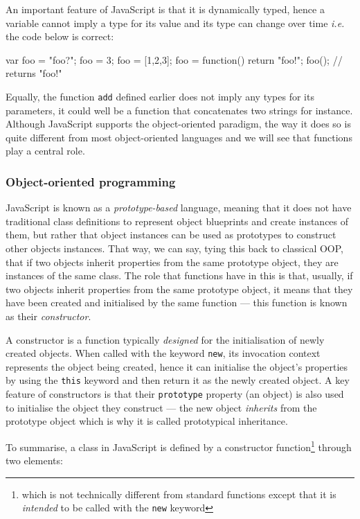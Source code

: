 An important feature of JavaScript is that it is dynamically typed, hence a variable cannot imply a type for its value and its type can change over time \emph{i.e.} the code below is correct:

\begin{code}[caption=JavaScript dynamic types,label=jstypes]
var foo = "foo?";
foo = 3;
foo = [1,2,3];
foo = function() {return "foo!"};
foo(); // returns "foo!"
\end{code}

Equally, the function \texttt{add} defined earlier does not imply any types for its parameters, it could well be a function that concatenates two strings for instance. Although JavaScript supports the object-oriented paradigm, the way it does so is quite different from most object-oriented languages and we will see that functions play a central role.

\subsubsection{Object-oriented programming}
\label{js}

JavaScript is known as a \emph{prototype-based} language, meaning that it does not have traditional class definitions to represent object blueprints and create instances of them, but rather that object instances can be used as prototypes to construct other objects instances. That way, we can say, tying this back to classical OOP, that if two objects inherit properties from the same prototype object, they are instances of the same class. The role that functions have in this is that, usually, if two objects inherit properties from the same prototype object, it means that they have been created and initialised by the same function --- this function is known as their \emph{constructor}.

A constructor is a function typically \emph{designed} for the initialisation of newly created objects. When called with the keyword \texttt{new}, its invocation context represents the object being created, hence it can initialise the object's properties by using the \texttt{this} keyword and then return it as the newly created object. A key feature of constructors is that their \texttt{prototype} property (an object) is also used to initialise the object they construct --- the new object \emph{inherits} from the prototype object which is why it is called prototypical inheritance.

To summarise, a class in JavaScript is defined by a constructor function\footnote{which is not technically different from standard functions except that it is \emph{intended} to be called with the \texttt{new} keyword} through two elements:

